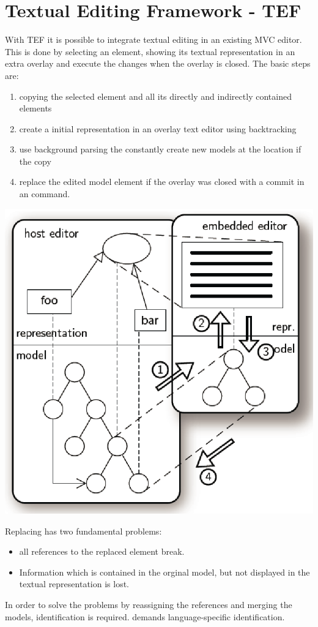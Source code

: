 \chapter{Textual Editing Framework - TEF}
With TEF it is possible to integrate textual editing in an existing MVC editor. This is done by selecting an element, showing its textual representation in an extra overlay and execute the changes when the overlay is closed. 
The basic steps are:
\begin{enumerate}
	\item copying the selected element and all its directly and indirectly contained elements
	\item create a initial representation in an overlay text editor using backtracking
	\item use background parsing the constantly create new models at the location if the copy
	\item replace the edited model element if the overlay was closed with a commit in an command.
\end{enumerate}

\includegraphics[scale=0.7]{gfx/tef.png}

Replacing has two fundamental problems:
\begin{itemize}
	\item all references to the replaced element break.
	\item Information which is contained in the orginal model, but not displayed in the textual representation is lost.
\end{itemize}
In order to solve the problems by reassigning the references and merging the models, identification is required. \cite{TefPaper} demands language-specific identification. 

